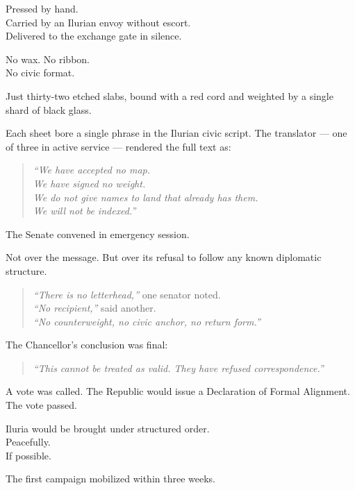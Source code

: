 \documentclass[9pt]{article}
\begin{document}
Pressed by hand.\\
Carried by an Ilurian envoy without escort.\\
Delivered to the exchange gate in silence.

No wax. No ribbon.\\
No civic format.

Just thirty-two etched slabs, bound with a red cord and weighted by a single shard of black glass.

Each sheet bore a single phrase in the Ilurian civic script. The translator --- one of three in active service --- rendered the full text as:

\begin{quote}
\textit{“We have accepted no map.}\\
\textit{We have signed no weight.}\\
\textit{We do not give names to land that already has them.}\\
\textit{We will not be indexed.”}
\end{quote}

\vspace{1em}

The Senate convened in emergency session.

Not over the message. But over its refusal to follow any known diplomatic structure.

\begin{quote}
\textit{“There is no letterhead,”} one senator noted.\\
\textit{“No recipient,”} said another.\\
\textit{“No counterweight, no civic anchor, no return form.”}
\end{quote}

The Chancellor’s conclusion was final:

\begin{quote}
\textit{“This cannot be treated as valid. They have refused correspondence.”}
\end{quote}

A vote was called. The Republic would issue a Declaration of Formal Alignment. The vote passed.

Iluria would be brought under structured order.\\
Peacefully.\\
If possible.

\vspace{1em}

The first campaign mobilized within three weeks.
\end{document}
